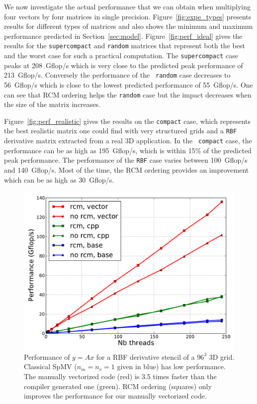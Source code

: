 \documentclass{sig-alternate}
\begin{document}
We now investigate the actual performance that we can obtain when
multiplying four vectors by four matrices in single
precision. Figure~\ref{fig:expe_types} presents results for different
types of matrices and also shows the minimum and maximum performance
predicted in Section~\ref{sec:model}. Figure~\ref{fig:perf_ideal}
gives the results for the {\tt supercompact} and {\tt random} matrices
that represent both the best and the worst case for such a practical 
computation. The {\tt supercompact} case peaks at
208~Gflop/s which is very close to the predicted peak
performance of 213~Gflop/s. Conversely the performance of the {\tt
  random} case decreases to 56~Gflop/s which is close to
the lowest predicted performance of 55~Gflop/s. One can see that RCM
ordering helps the {\tt random} case but the impact decreases when the
size of the matrix increases.

Figure~\ref{fig:perf_realistic} gives the results on the {\tt compact}
case, which represents the best realistic matrix one could find with very
structured grids and a
{\tt RBF} derivative matrix extracted from a real 3D application. In the {\tt
  compact} case, the performance can be as high as 195~Gflop/s, which is
within 15\% of the predicted  peak performance. The performance of the
{\tt RBF} case varies between 100~Gflop/s and 140~Gflop/s. Most of the
time, the RCM ordering provides an improvement which can be as high as
30~Gflop/s.

\begin{figure}[t]
  \centering 
  
  \includegraphics[width=.9\linewidth]{figures/mic_performance_nb_threads.pdf}

  \caption{Performance of $y=Ax$ for a RBF derivative stencil of a
    $96^3$ 3D grid. Classical SpMV ($n_m=n_v=1$ given in blue) has low
    performance. The manually vectorized code (red) is 3.5 times
    faster than the compiler generated one (green). RCM ordering
    (squares) only improves the performance for our manually
    vectorized code.}
  \label{fig:comparison_spmv}
  \label{fig:perf_mic}
\end{figure}
\end{document}

